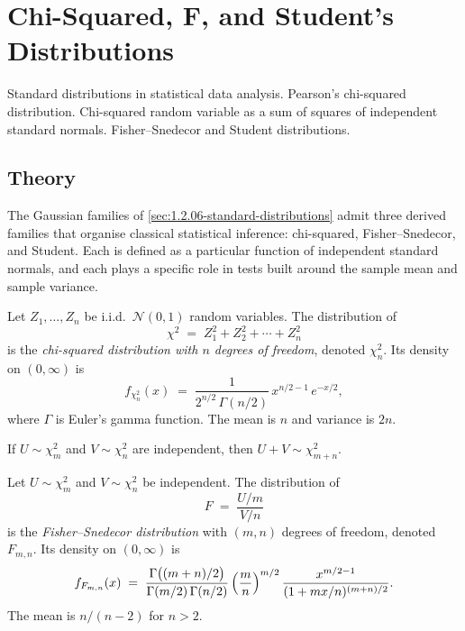 
\section{Chi-Squared, F, and Student's Distributions}
\label{sec:1.2.10-chi2-f-student}

\begin{ticket}
Standard distributions in statistical data analysis. Pearson's chi-squared distribution. Chi-squared random variable as a sum of squares of independent standard normals. Fisher–Snedecor and Student distributions.
\end{ticket}

\subsection*{Theory}

The Gaussian families of \cref{sec:1.2.06-standard-distributions}
admit three derived families that organise classical statistical
inference: chi-squared, Fisher–Snedecor, and Student. Each is
defined as a particular function of independent standard normals,
and each plays a specific role in tests built around the sample
mean and sample variance.

\begin{definition}
\label{def:chi-squared}
Let $Z_1, \dots, Z_n$ be i.i.d.\ $\mathcal{N}(0, 1)$ random variables.
The distribution of
\[
  \chi^2 \;=\; Z_1^2 + Z_2^2 + \cdots + Z_n^2
\]
is the \emph{chi-squared distribution with $n$ degrees of freedom},
denoted $\chi^2_n$. Its density on $(0, \infty)$ is
\[
  f_{\chi^2_n}(x) \;=\; \frac{1}{2^{n/2}\, \Gamma(n/2)}\, x^{n/2 - 1}\, e^{-x/2},
\]
where $\Gamma$ is Euler's gamma function. The mean is $n$ and
variance is $2n$.
\end{definition}

\begin{proposition}
\label{prop:chi2-closure}
If $U \sim \chi^2_m$ and $V \sim \chi^2_n$ are independent, then
$U + V \sim \chi^2_{m+n}$.
\end{proposition}

\begin{definition}
\label{def:f-distribution}
Let $U \sim \chi^2_m$ and $V \sim \chi^2_n$ be independent. The
distribution of
\[
  F \;=\; \frac{U / m}{V / n}
\]
is the \emph{Fisher–Snedecor distribution} with $(m, n)$ degrees of
freedom, denoted $F_{m, n}$. Its density on $(0, \infty)$ is
\[
  f_{F_{m,n}}(x) \;=\; \frac{\Gamma\bigl((m+n)/2\bigr)}{\Gamma(m/2)\, \Gamma(n/2)}\, \Bigl(\frac{m}{n}\Bigr)^{m/2}\, \frac{x^{m/2 - 1}}{(1 + m x/n)^{(m+n)/2}}.
\]
The mean is $n/(n - 2)$ for $n > 2$.
\end{definition}

